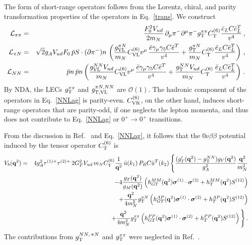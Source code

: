 \documentclass[letterpaper,11pt]{article}
\newcommand{\g}{\gamma}
\newcommand{\vL}{\ensuremath{\mathcal{L}}}
\newcommand{\boldsigma}{\mbox{\boldmath $\sigma$}}
\renewcommand{\vec}[1]{{\mathbf #1}}
\newcommand{\sq}{^{2}}
\newcommand{\nn}{\nonumber}
\begin{document}
The form of short-range operators follows from the Lorentz, chiral, and parity transformation properties of the operators in Eq.\  \eqref{trans}.  We construct
\begin{eqnarray}\label{NNLag}
\mathcal L_{\pi\pi} &=&   \frac{F_0^2V_{ud}}{2 m_N}\,  \partial_\mu \pi^- \partial^\mu \pi^-{g^{\pi\pi}_{\rm T}C^{(6)}_{\rm T}}\frac{\bar e_L C \bar e_L^T}{v^4}\,,\nn \\ 
\mathcal L_{\pi N}  &=&  \sqrt{2}g_AV_{ud} F_0\, \bar p S\cdot (\partial \pi^-) n  \, \left (  \frac{g^{\pi N}_{\rm VL}}{m_N} C^{(6)}_{\rm VL}  v^\mu  \, \frac{\bar e \g_\mu \g_5 C\bar e^T}{v^4} 
+ \frac{g^{\pi N}_{\rm T}}{m_N} C^{(6)}_{\rm T} \frac{\bar e_L C \bar e_L^T}{v^4} 
\right)\,,  \nn \\
\vL_{NN} &=&   \bar p    n\, \bar p   n \left(   \frac{g^{N N}_{\rm VL}V_{ud}}{m_N} C^{(6)}_{\rm VL}  v^\mu  \, \frac{\bar e \g_\mu \g_5 C\bar e^T}{v^4} 
+ \frac{g^{N N}_{\rm T}V_{ud}}{m_N} C^{(6)}_{\rm T}\,  \frac{\bar e_L C \bar e_L^T}{v^4} \right)\,.
\end{eqnarray}
By NDA, the LECs  $g^{\pi\pi}_{\rm T}$ and $g^{\pi N, NN}_{\rm T, VL}$ are $\mathcal O(1)$.
The hadronic component of the operators in Eq.\ \eqref{NNLag} is parity-even. $C^{(6)}_{\rm VR}$, on the other hand, induces short-range operators that are parity-odd, if one neglects the lepton momenta, 
and thus does not contribute to Eq.\ \eqref{NNLag} or $0^+\to 0^+$ transitions.

From the discussion in Ref.\ \cite{Cirigliano:2017djv} and Eq.\ \eqref{NNLag}, it follows that the $0\nu\beta\beta$ potential induced by the tensor operator $C^{(6)}_{\rm T}$ is
\begin{eqnarray}\label{tensor}
V_b(\vec q^2) &=&  4 g_A\sq \tau^{(1) +} \tau^{(2) + } \, 2  G_F^2V_{ud} \,   m_N C^{(6)}_{\textrm{T}} \frac{1}{\vec q^2}\, \bar u(k_1) \,P_R C \bar u^T(k_2)\, 
\Bigg\{  \frac{ ( g^\prime_{T}(\vec q^2) - g_{\rm  T}^{NN} ) g_V(\vec q^2)}{g_A\sq} \frac{\vec q^2}{m_N^2} \nonumber \\
& & - 4\frac{ g_T(\vec q^2) }{g_M(\vec q\sq)}   \left( h_{GT}^{MM}(\vec q\sq)\boldsigma^{(1)} \cdot \boldsigma^{(2)} 
+ h_{T}^{MM}(\vec q\sq)S^{(12)} \right)  \nn 
\\ & & 
+  \frac{\vec q^2}{4m_N^2}  g^{\pi N}_{\rm T}\left(h^{AP}_{GT}(\vec q^2) {\boldsigma^{(1)} \cdot \boldsigma^{(2)} }+ h^{AP}_{T}(\vec q^2){S^{(12)} } \right) \nn\\
&&+\frac{\vec q^2}{4 m_N^2}  g_{ \rm T}^{\pi\pi} \left(  h^{PP}_{GT}(\vec q^2){\boldsigma^{(1)} \cdot \boldsigma^{(2)} }  + h^{PP}_{T}(\vec q^2){S^{(12)} } \right)
\Bigg\}\,. 
\end{eqnarray}
The contributions from $g^{NN,\, \pi N}_{\rm T}$ and $g^{\pi\pi}_{\rm T}$ were neglected in Ref.\ \cite{Cirigliano:2017djv}.
\end{document}
